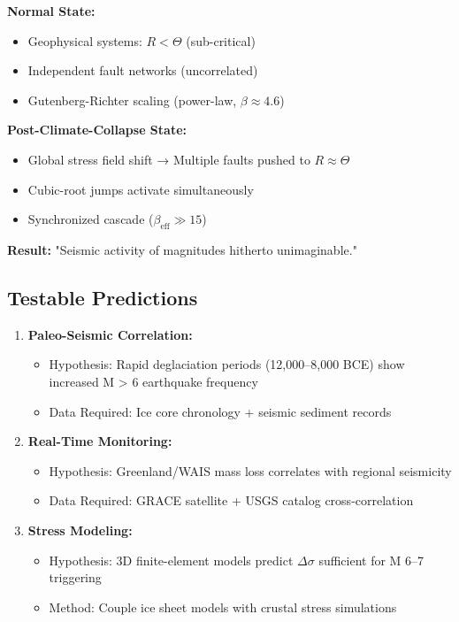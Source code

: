 \documentclass[11pt,a4paper]{article}
\begin{document}
\textbf{Normal State:}
\begin{itemize}
\item Geophysical systems: $R < \Theta$ (sub-critical)
\item Independent fault networks (uncorrelated)
\item Gutenberg-Richter scaling (power-law, $\beta \approx 4.6$)
\end{itemize}

\textbf{Post-Climate-Collapse State:}
\begin{itemize}
\item Global stress field shift → Multiple faults pushed to $R \approx \Theta$
\item Cubic-root jumps activate simultaneously
\item Synchronized cascade ($\beta_{\text{eff}} \gg 15$)
\end{itemize}

\textbf{Result:} "Seismic activity of magnitudes hitherto unimaginable."

\subsection{Testable Predictions}

\begin{enumerate}
\item \textbf{Paleo-Seismic Correlation:}
   \begin{itemize}
   \item Hypothesis: Rapid deglaciation periods (12,000--8,000 BCE) show increased M > 6 earthquake frequency
   \item Data Required: Ice core chronology + seismic sediment records
   \end{itemize}

\item \textbf{Real-Time Monitoring:}
   \begin{itemize}
   \item Hypothesis: Greenland/WAIS mass loss correlates with regional seismicity
   \item Data Required: GRACE satellite + USGS catalog cross-correlation
   \end{itemize}

\item \textbf{Stress Modeling:}
   \begin{itemize}
   \item Hypothesis: 3D finite-element models predict $\Delta \sigma$ sufficient for M 6--7 triggering
   \item Method: Couple ice sheet models with crustal stress simulations
   \end{itemize}
\end{enumerate}
\end{document}
